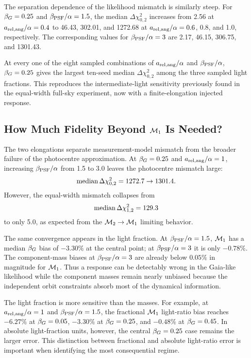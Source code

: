 The separation dependence of the likelihood mismatch is similarly steep. For $\beta_G=0.25$ and $\beta_{\rm PSF}/\alpha=1.5$, the median $\Delta\chi^2_{0,2}$ increases from 2.56 at $a_{\rm rel,ang}/\alpha=0.4$ to 46.43, 302.01, and 1272.68 at $a_{\rm rel,ang}/\alpha=0.6$, 0.8, and 1.0, respectively. The corresponding values for $\beta_{\rm PSF}/\alpha=3$ are 2.17, 46.15, 306.75, and 1301.43.

At every one of the eight sampled combinations of $a_{\rm rel,ang}/\alpha$ and $\beta_{\rm PSF}/\alpha$, $\beta_G=0.25$ gives the largest ten-seed median $\Delta\chi^2_{0,2}$ among the three sampled light fractions. This reproduces the intermediate-light sensitivity previously found in the equal-width full-sky experiment, now with a finite-elongation injected response.

\subsection{How Much Fidelity Beyond $\mathcal{M}_1$ Is Needed?}

The two elongations separate measurement-model mismatch from the broader failure of the photocentre approximation. At $\beta_G=0.25$ and $a_{\rm rel,ang}/\alpha=1$, increasing $\beta_{\rm PSF}/\alpha$ from 1.5 to 3.0 leaves the photocentre mismatch large:
\begin{equation}
{\rm median}\,\Delta\chi^2_{0,2}=1272.7\rightarrow1301.4.
\end{equation}
However, the equal-width mismatch collapses from
\begin{equation}
{\rm median}\,\Delta\chi^2_{1,2}=129.3
\end{equation}
to only 5.0, as expected from the $\mathcal{M}_2\rightarrow\mathcal{M}_1$ limiting behavior.

The same convergence appears in the light fraction. At $\beta_{\rm PSF}/\alpha=1.5$, $\mathcal{M}_1$ has a median $\beta_G$ bias of $-3.30\%$ at the central point; at $\beta_{\rm PSF}/\alpha=3$ it is only $-0.78\%$. The component-mass biases at $\beta_{\rm PSF}/\alpha=3$ are already below $0.05\%$ in magnitude for $\mathcal{M}_1$. Thus a response can be detectably wrong in the Gaia-like likelihood while the component masses remain nearly unbiased because the independent orbit constraints absorb most of the dynamical information.

The light fraction is more sensitive than the masses. For example, at $a_{\rm rel,ang}/\alpha=1$ and $\beta_{\rm PSF}/\alpha=1.5$, the fractional $\mathcal{M}_1$ light-ratio bias reaches $-6.27\%$ at $\beta_G=0.05$, $-3.30\%$ at $\beta_G=0.25$, and $-0.48\%$ at $\beta_G=0.45$. In absolute light-fraction units, however, the central $\beta_G=0.25$ case remains the larger error. This distinction between fractional and absolute light-ratio error is important when identifying the most consequential regime.

